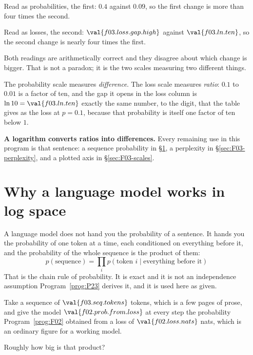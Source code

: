 \begin{fr}
\begin{ansblock}
Read as probabilities, the first: $\num{0.4}$ against $\num{0.09}$, so the
first change is more than four times the second.

Read as losses, the second: $\val{f03.loss.gap.high}$ against
$\val{f03.ln.ten}$, so the second change is nearly four times the first.

Both readings are arithmetically correct and they disagree about which change
is bigger. That is not a paradox; it is the two scales measuring two different
things.
\end{ansblock}

The probability scale measures \emph{difference}. The loss scale measures
\emph{ratio}: $\num{0.1}$ to $\num{0.01}$ is a factor of ten, and the gap it
opens in the loss column is $\ln 10 = \val{f03.ln.ten}$ exactly \dash{} the
same number, to the digit, that the table gives as the loss at
$p = \num{0.1}$, because that probability is itself one factor of ten below
$1$.

\textbf{A logarithm converts ratios into differences.} Every remaining use in
this program is that sentence: a sequence probability in
\S\ref{sec:F03-logspace}, a perplexity in \S\ref{sec:F03-perplexity}, and a
plotted axis in \S\ref{sec:F03-scales}.
\end{fr}

\section{Why a language model works in log space}
\label{sec:F03-logspace}

\begin{fr}
A language model does not hand you the probability of a sentence. It hands you
the probability of one token at a time, each conditioned on everything before
it, and the probability of the whole sequence is the product of them:
\[ p(\text{sequence})
   = \prod_{i} p(\text{token } i \mid \text{everything before it}) \]
That is the chain rule of probability. It is exact and it is not an
independence assumption \dash{} Program~\ref{prog:P23} derives it, and it is
used here as given.

Take a sequence of $\val{f03.seq.tokens}$ tokens, which is a few pages of
prose, and give the model $\val{f02.prob.from.loss}$ at every step \dash{} the
probability Program~\ref{prog:F02} obtained from a loss of
$\val{f02.loss.nats}$ nats, which is an ordinary figure for a working model.

Roughly how big is that product?
\nextframe
\end{fr}

